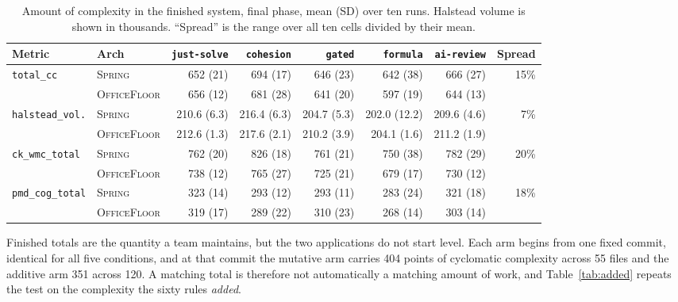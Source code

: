 \documentclass[11pt,a4paper]{article}
\newcommand{\sprg}{\textsc{Spring}}
\newcommand{\offl}{\textsc{OfficeFloor}}
\begin{document}
\begin{table}[t]
\centering
\caption{Amount of complexity in the finished system, final phase, mean (SD)
over ten runs. Halstead volume is shown in thousands. ``Spread'' is the range
over all ten cells divided by their mean.}
\label{tab:amount}
\scriptsize
\setlength{\tabcolsep}{3.5pt}
\begin{tabular}{llrrrrrr}
\toprule
Metric & Arch & \texttt{just-solve} & \texttt{cohesion} & \texttt{gated} & \texttt{formula} & \texttt{ai-review} & Spread \\
\midrule
\texttt{total\_cc} & \sprg{}  & 652 (21) & 694 (17) & 646 (23) & 642 (38) & 666 (27) & \multirow{2}{*}{15\%} \\
                   & \offl{}  & 656 (12) & 681 (28) & 641 (20) & 597 (19) & 644 (13) & \\
\addlinespace
\texttt{halstead\_vol.} & \sprg{} & 210.6 (6.3) & 216.4 (6.3) & 204.7 (5.3) & 202.0 (12.2) & 209.6 (4.6) & \multirow{2}{*}{7\%} \\
                          & \offl{} & 212.6 (1.3) & 217.6 (2.1) & 210.2 (3.9) & 204.1 (1.6) & 211.2 (1.9) & \\
\addlinespace
\texttt{ck\_wmc\_total} & \sprg{} & 762 (20) & 826 (18) & 761 (21) & 750 (38) & 782 (29) & \multirow{2}{*}{20\%} \\
                        & \offl{} & 738 (12) & 765 (27) & 725 (21) & 679 (17) & 730 (12) & \\
\addlinespace
\texttt{pmd\_cog\_total} & \sprg{} & 323 (14) & 293 (12) & 293 (11) & 283 (24) & 321 (18) & \multirow{2}{*}{18\%} \\
                               & \offl{} & 319 (17) & 289 (22) & 310 (23) & 268 (14) & 303 (14) & \\
\bottomrule
\end{tabular}
\end{table}

Finished totals are the quantity a team maintains, but the two applications do
not start level. Each arm begins from one fixed commit, identical for all five
conditions, and at that commit the mutative arm carries 404 points of cyclomatic
complexity across 55 files and the additive arm 351 across 120. A matching
total is therefore not automatically a matching amount of work, and
Table~\ref{tab:added} repeats the test on the complexity the sixty rules
\emph{added}.
\end{document}
